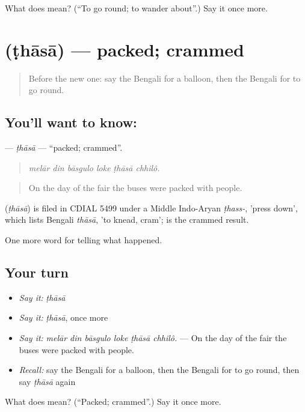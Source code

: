 \begin{tcolorbox}[breakable,colback=teal!4,colframe=teal!35!black,title={Before you move on}]
What does  mean? (\textquotedblleft{}To go round; to wander about\textquotedblright{}.) Say it once more.
\end{tcolorbox}
\section[\texorpdfstring{\bn{ঠাসা} (ṭhāsā)}{ঠাসা (ṭhāsā)}]{ (ṭhāsā) — packed; crammed}

\label{lesson:BN-C311-thasa}



\begin{quote}
Before the new one: say the Bengali for a balloon, then the Bengali for to go round.
\end{quote}

\subsection*{You'll want to know: }
\textbf{} — \emph{ṭhāsā} — \textquotedblleft{}packed; crammed\textquotedblright{}.

\begin{quote}
     
\end{quote}

\begin{quote}
\emph{melār din bāsgulo loke ṭhāsā chhilô.}
\end{quote}

\begin{quote}
On the day of the fair the buses were packed with people.
\end{quote}

\begin{cousinweb}
\textbf{} (\emph{ṭhāsā}) is filed in CDIAL 5499 under a Middle Indo-Aryan \emph{ṭhass-}, 'press down', which lists Bengali \emph{thāsā}, 'to knead, cram';  is the crammed result.
\end{cousinweb}

\begin{grammarlens}[title={What you've built}]
One more word for telling what happened.
\end{grammarlens}

\subsection*{Your turn}
\begin{itemize}
\raggedright
  \item \emph{Say it:} \emph{ṭhāsā}
  \item \emph{Say it:} \emph{ṭhāsā}, once more
  \item \emph{Say it:} \emph{melār din bāsgulo loke ṭhāsā chhilô.} — On the day of the fair the buses were packed with people.
  \item \emph{Recall:} say the Bengali for a balloon, then the Bengali for to go round, then say \emph{ṭhāsā} again
\end{itemize}

\begin{tcolorbox}[breakable,colback=teal!4,colframe=teal!35!black,title={Before you move on}]
What does  mean? (\textquotedblleft{}Packed; crammed\textquotedblright{}.) Say it once more.
\end{tcolorbox}
